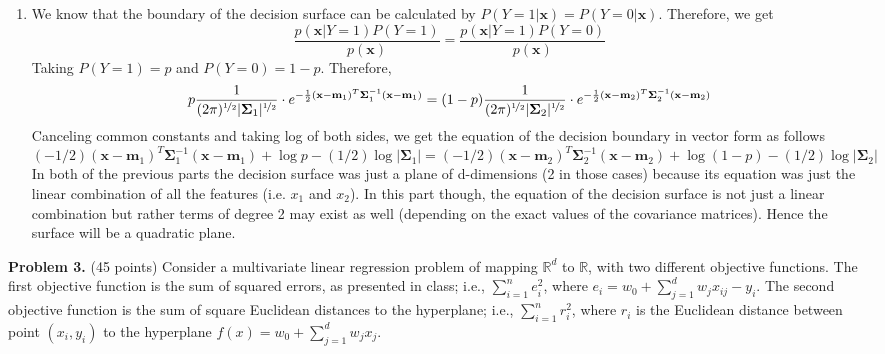\documentclass[twoside]{article}
\begin{document}
\begin{enumerate}
	\item
	We know that the boundary of the decision surface can be calculated by $P(Y=1|\mathbf{x})=P(Y=0|\mathbf{x})$.
	Therefore, we get
	\begin{equation*}
		\frac{p(\mathbf{x}|Y=1)P(Y=1)}{p(\mathbf{x})} = \frac{p(\mathbf{x}|Y=1)P(Y=0)}{p(\mathbf{x})}
	\end{equation*}
	Taking $P(Y=1) = p$ and $P(Y=0) = 1 - p$. Therefore,
	\begin{equation*}
		p\frac{1}{(2\pi)^{\nicefrac{1}{2}} |\mathbf{\Sigma}_{1}|^{\nicefrac{1}{2}}}\cdot e^{-\frac{1}{2}(\mathbf{x}-\mathbf{m}_{1})^{T}\mathbf{\Sigma}_{1}^{-1}(\mathbf{x}-\mathbf{m}_{1})} = (1-p)\frac{1}{(2\pi)^{\nicefrac{1}{2}} |\mathbf{\Sigma}_{2}|^{\nicefrac{1}{2}}}\cdot e^{-\frac{1}{2}(\mathbf{x}-\mathbf{m}_{2})^{T}\mathbf{\Sigma}_{2}^{-1}(\mathbf{x}-\mathbf{m}_{2})}
	\end{equation*}
	Canceling common constants and taking log of both sides, we get the equation of the decision boundary in vector form as follows
	\begin{equation*}
		(-1/2)(\mathbf{x}-\mathbf{m}_{1})^{T}\mathbf{\Sigma}_{1}^{-1}(\mathbf{x}-\mathbf{m}_{1}) + \log p -(1/2)\log|\mathbf{\Sigma}_1|= (-1/2)(\mathbf{x}-\mathbf{m}_{2})^{T}\mathbf{\Sigma}_{2}^{-1}(\mathbf{x}-\mathbf{m}_{2}) + \log (1 - p) -(1/2)\log|\mathbf{\Sigma}_2|
	\end{equation*}
	In both of the previous parts the decision surface was just a plane of d-dimensions (2 in those cases) because its equation was just the linear combination of all the features (i.e. $x_1$ and $x_2$). In this part though, the equation of the decision surface is not just a linear combination but rather terms of degree 2 may exist as well (depending on the exact values of the covariance matrices). Hence the surface will be a quadratic plane.

\end{enumerate}




\textbf{Problem 3.} (45 points) Consider a multivariate linear regression problem of mapping $\mathbb{R}^d$ to $\mathbb{R}$, with two different objective functions. The first objective function is the sum of squared errors, as presented in class; i.e., $\sum_{i=1}^{n}e_{i}^2$, where $e_i=w_0 + \sum_{j=1}^{d}w_jx_{ij} - y_i$. The second objective function is the sum of square Euclidean distances to the hyperplane; i.e., $\sum_{i=1}^{n}r_{i}^2$, where $r_i$ is the Euclidean distance between point $(x_i,y_i)$ to the hyperplane $f(x)=w_0 + \sum_{j=1}^{d}w_jx_j$.
\end{document}
